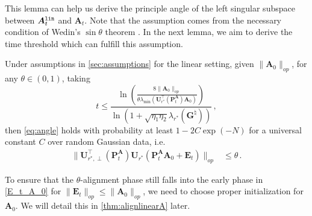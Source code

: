 This lemma can help us derive the principle angle of the left singular subspace between $\bm A^{\tt lin}_t$ and $\bm A_t$. Note that the assumption comes from the necessary condition of Wedin's $\sin \theta$ theorem \citep{wedin1972perturbation}. In the next lemma, we aim to derive the time threshold which can fulfill this assumption.
\begin{lemma}\label{lemma:aligntheta}
Under assumptions in \cref{sec:assumptions} for the linear setting, given $\| \bm A_0\|_{op}$, 
    for any $\theta \in (0,1)$, taking
    \[
    t \leq \frac{\ln\left(\frac{8\|\bm A_0\|_{op}}{\theta \lambda_{\min}(\bm U^{\!\top}_{r^*}(\bm P_t^{\bm A}) \bm A_0)}\right)}{\ln\left(1+\sqrt{\eta_1 \eta_2}\lambda_{r^*}\left({\bm G}^{\natural}\right)\right)}\,,
    \]
     then \cref{eq:angle} holds with probability at least $1- 2C\exp(- N)$ for a universal constant $C$ over random Gaussian data, i.e. 
    \begin{align*}
        \|\bm U^{\!\top}_{r^*,\perp}(\bm P_t^{\bm A})\bm U_{r^*}(\bm P_t^{\bm A}\bm A_0+\bm E_t)\|_{op} & \leq \theta\, .
    \end{align*}
\end{lemma}
 To ensure that the $\theta$-alignment phase still falls into the early phase in \cref{E_t_A_0} for $\| \bm E_t \|_{op} \leq \| \bm A_0 \|_{op}$, we need to choose proper initialization for $\bm A_0$.
We will detail this in \cref{thm:alignlinearA} later.
